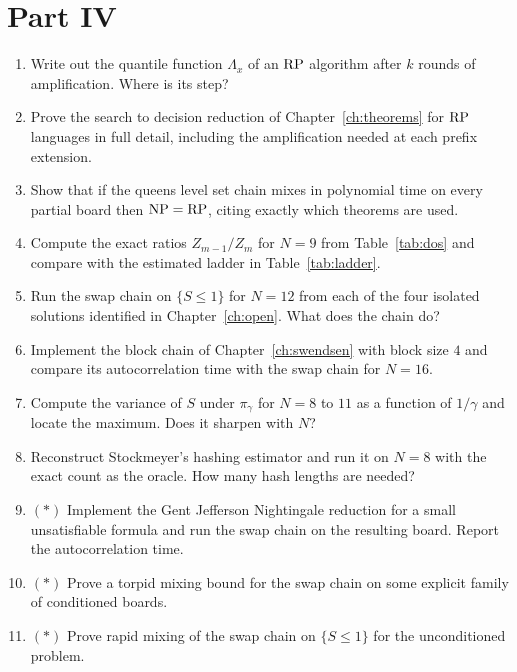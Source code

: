 \section*{Part IV}

\begin{enumerate}
\item Write out the quantile function $\Lambda_x$ of an $\mathrm{RP}$ algorithm after $k$ rounds of amplification. Where is its step?

\item Prove the search to decision reduction of Chapter~\ref{ch:theorems} for $\mathrm{RP}$ languages in full detail, including the amplification needed at each prefix extension.

\item Show that if the queens level set chain mixes in polynomial time on every partial board then $\mathrm{NP} = \mathrm{RP}$, citing exactly which theorems are used.

\item Compute the exact ratios $Z_{m-1}/Z_m$ for $N = 9$ from Table~\ref{tab:dos} and compare with the estimated ladder in Table~\ref{tab:ladder}.

\item Run the swap chain on $\{ S \le 1 \}$ for $N = 12$ from each of the four isolated solutions identified in Chapter~\ref{ch:open}. What does the chain do?

\item Implement the block chain of Chapter~\ref{ch:swendsen} with block size $4$ and compare its autocorrelation time with the swap chain for $N = 16$.

\item Compute the variance of $S$ under $\pi_\gamma$ for $N = 8$ to $11$ as a function of $1/\gamma$ and locate the maximum. Does it sharpen with $N$?

\item Reconstruct Stockmeyer's hashing estimator and run it on $N = 8$ with the exact count as the oracle. How many hash lengths are needed?

\item $(*)$ Implement the Gent Jefferson Nightingale reduction for a small unsatisfiable formula and run the swap chain on the resulting board. Report the autocorrelation time.

\item $(*)$ Prove a torpid mixing bound for the swap chain on some explicit family of conditioned boards.

\item $(*)$ Prove rapid mixing of the swap chain on $\{ S \le 1 \}$ for the unconditioned problem.
\end{enumerate}
